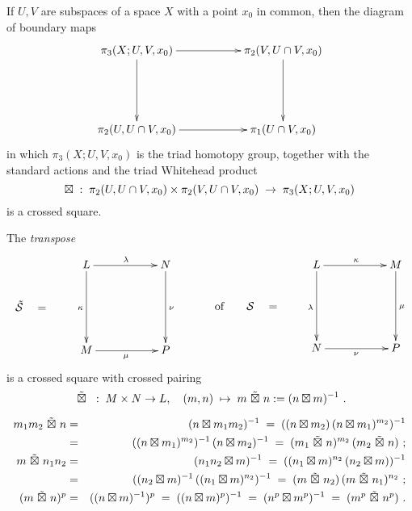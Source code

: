 \begin{example}
If $U, V$ are subspaces of a space $X$ with a point $x_0$ in common, 
then the diagram of boundary maps 
$$
\xymatrix{
\pi_3(X;U,V, x_0) \ar[rr] \ar[dd]  && \pi_2(V, U \cap V, x_0) \ar[dd] \\
       \\
\pi_2(U, U \cap V, x_0) \ar[rr] && \pi_1(U \cap V, x_0) 
}
$$
in which $\pi_3(X;U,V,x_0)$ is the triad homotopy group, 
together with the standard actions and the triad Whitehead product
$$
\boxtimes \;:\; 
 \pi_2(U, U \cap V, x_0) \times \pi_2(V, U \cap V, x_0) 
 \;\to\; \pi_3(X;U, V, x_0)
$$
is a crossed square. 
\end{example}

\begin{lem} \label{lem:Stranspose}
The \emph{transpose}
$$
\xymatrix{
  &  L \ar[rr]^{\lambda} \ar[dd]_{\kappa} 
     &&  N \ar[dd]^{\nu} \\
\tilde{\calS} \quad = 
  &  &&                             \\
  &  M \ar[rr]_{\mu} 
     && P 
}
\xymatrix{
  &&  L \ar[rr]^{\kappa} \ar[dd]_{\lambda} 
     &&  M \ar[dd]^{\mu} \\
  & \mbox{of} \qquad \calS \quad =  
   & &&                             \\
  &&  N \ar[rr]_{\nu} 
     &&  P 
}
$$
is a crossed square with crossed pairing
\begin{equation} \label{eq:btt}
\ \tilde{\boxtimes}\  \;:\; M \times N \to L, \quad 
(m,n) \;\mapsto\; m \ \tilde{\boxtimes}\  n := (n \boxtimes m)^{-1}~.
\end{equation}
\end{lem}
\begin{pf}
\begin{eqnarray*}
m_1m_2 \ \tilde{\boxtimes}\  n
  & = & (n \boxtimes m_1m_2)^{-1}
  \;=\; ((n \boxtimes m_2)\,(n \boxtimes m_1)^{m_2})^{-1} \\
  & = & ((n \boxtimes m_1)^{m_2})^{-1}\,(n \boxtimes m_2)^{-1}
  \;=\; (m_1 \ \tilde{\boxtimes}\  n)^{m_2}\,(m_2 \ \tilde{\boxtimes}\  n)~;\\
m \ \tilde{\boxtimes}\  n_1n_2
  & = & (n_1n_2 \boxtimes m)^{-1}
  \;=\; ((n_1 \boxtimes m)^{n_2}\,(n_2 \boxtimes m))^{-1} \\
  & = & ((n_2 \boxtimes m)^{-1}\,((n_1 \boxtimes m)^{n_2})^{-1}
  \;=\; (m \ \tilde{\boxtimes}\  n_2)\,(m \ \tilde{\boxtimes}\  n_1)^{n_2}~;\\ 
(m \ \tilde{\boxtimes}\  n)^p 
  & = & ((n \boxtimes m)^{-1})^p 
  \;=\; ((n \boxtimes m)^p)^{-1} 
  \;=\; (n^p \boxtimes m^p)^{-1} 
  \;=\; (m^p \ \tilde{\boxtimes}\  n^p)~. 
\end{eqnarray*}
\end{pf}

